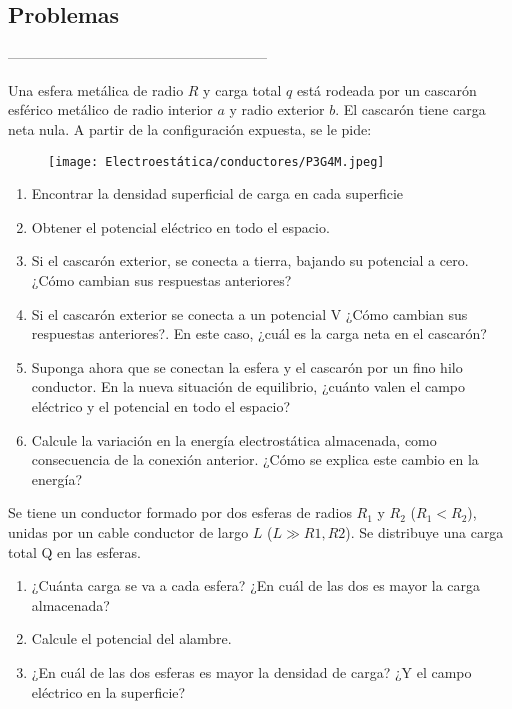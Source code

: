 

\subsection{Problemas}
--------------------------------------------------------


\np
Una esfera metálica de radio $R$ y carga total $q$ está rodeada por un cascarón esférico metálico de radio interior $a$ y radio exterior $b$. El cascarón tiene carga neta nula. A partir de la configuración expuesta, se le pide:

\begin{figure}[H]
    \centering
    \texttt{[image: Electroestática/conductores/P3G4M.jpeg]}
\end{figure}

\begin{enumerate}[label=\alph*)]
    \item Encontrar la densidad superficial de carga en cada superficie
    \item Obtener el potencial eléctrico en todo el espacio.
    \item Si el cascarón exterior, se conecta a tierra, bajando su potencial a cero. ¿Cómo cambian sus respuestas anteriores?
    \item Si el cascarón exterior se conecta a un potencial V ¿Cómo cambian sus respuestas anteriores?. En este caso, ¿cuál es la carga neta en el cascarón?
    \item Suponga ahora que se conectan la esfera y el cascarón por un fino hilo conductor. En la nueva situación de equilibrio, ¿cuánto valen el campo eléctrico y el potencial en todo el espacio?
    \item Calcule la variación en la energía electrostática almacenada, como consecuencia de la conexión anterior. ¿Cómo se explica este cambio en la energía?
\end{enumerate}
\bigbreak
\bigbreak

\np
Se tiene un conductor formado por dos esferas de radios $R_1$ y $R_2$ ($R_1 < R_2$), unidas por un cable conductor de largo $L$ ($L \gg R1, R2$). Se distribuye una carga total Q en las esferas.

\begin{enumerate}[label=\alph*)]
    \item ¿Cuánta carga se va a cada esfera? ¿En cuál de las dos es mayor la carga almacenada?
    \item Calcule el potencial del alambre.
    \item ¿En cuál de las dos esferas es mayor la densidad de carga? ¿Y el campo eléctrico en la superficie?
\end{enumerate}

